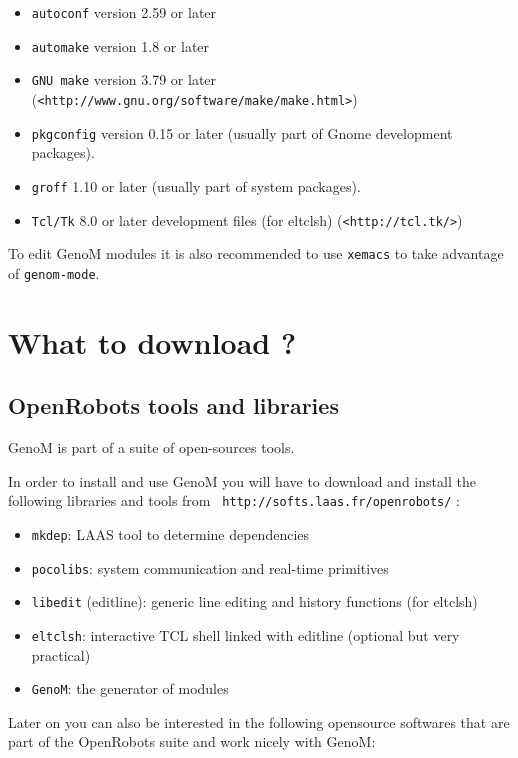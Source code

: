 \begin{itemize}
\item {\tt autoconf} version 2.59 or later
\item {\tt automake} version 1.8 or later
\item {\tt GNU make} version 3.79 or later  ({\tt <http://www.gnu.org/software/make/make.html>})
\item {\tt pkgconfig} version 0.15 or later (usually part of Gnome development packages).
\item {\tt groff} 1.10 or later (usually part of system packages).
\item {\tt Tcl/Tk} 8.0 or later development files (for eltclsh) ({\tt <http://tcl.tk/>})
\end{itemize}

To edit GenoM modules it is also recommended to use {\tt xemacs} to take
advantage of {\tt genom-mode}.

\section{What to download ?}
\label{sec|configuration|download}

\subsection{OpenRobots tools and libraries}

GenoM is part of a suite of open-sources tools. 

In order to install and use GenoM you will have to download and install
the following libraries and tools from  {\tt
http://softs.laas.fr/openrobots/} :

\begin{itemize}
\item {\tt mkdep}: LAAS tool to determine dependencies
\item {\tt pocolibs}: system communication and real-time primitives
\item {\tt libedit} (editline): generic line editing and history
functions (for eltclsh)
\item {\tt eltclsh}: interactive TCL shell linked with editline (optional but very practical)
\item {\tt GenoM}: the generator of modules
\end{itemize}

Later on you can also be interested in the following opensource softwares
that are part of the OpenRobots suite and work nicely with GenoM:


